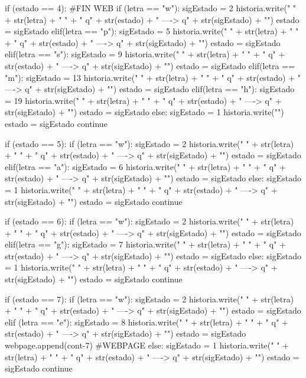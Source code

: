 \documentclass{article}
\begin{document}
\begin{python}
				if (estado == 4): #FIN WEB
					if (letra == "w"):
						sigEstado = 2   
						historia.write(" { " + str(letra) + " } " + "  q" + str(estado) + "  ---->  q" + str(sigEstado) + "\n")
						estado = sigEstado               
					elif(letra == "p"):
						sigEstado = 5
						historia.write(" { " + str(letra) + " } " + "  q" + str(estado) + "  ---->  q" + str(sigEstado) + "\n")
						estado = sigEstado    
					elif(letra == "s"):
						sigEstado = 9
						historia.write(" { " + str(letra) + " } " + "  q" + str(estado) + "  ---->  q" + str(sigEstado) + "\n")
						estado = sigEstado    
					elif(letra == "m"):
						sigEstado = 13
						historia.write(" { " + str(letra) + " } " + "  q" + str(estado) + "  ---->  q" + str(sigEstado) + "\n")
						estado = sigEstado  
					elif(letra == "h"):
						sigEstado = 19
						historia.write(" { " + str(letra) + " } " + "  q" + str(estado) + "  ---->  q" + str(sigEstado) + "\n")
						estado = sigEstado    
					else:
						sigEstado = 1   
						historia.write("\n")
						estado = sigEstado
					continue
			
				if (estado == 5):   
					if (letra == "w"):
						sigEstado = 2   
						historia.write(" { " + str(letra) + " } " + "  q" + str(estado) + "  ---->  q" + str(sigEstado) + "\n")
						estado = sigEstado              
					elif(letra == "a"):
						sigEstado = 6
						historia.write(" { " + str(letra) + " } " + "  q" + str(estado) + "  ---->  q" + str(sigEstado) + "\n")
						estado = sigEstado            
					else:
						sigEstado = 1
						historia.write(" { " + str(letra) + " } " + "  q" + str(estado) + "  ---->  q" + str(sigEstado) + "\n")
						estado = sigEstado
					continue
			
				if (estado == 6):
					if (letra == "w"):
						sigEstado = 2   
						historia.write(" { " + str(letra) + " } " + "  q" + str(estado) + "  ---->  q" + str(sigEstado) + "\n")
						estado = sigEstado              
					elif(letra == "g"):
						sigEstado = 7
						historia.write(" { " + str(letra) + " } " + "  q" + str(estado) + "  ---->  q" + str(sigEstado) + "\n")
						estado = sigEstado            
					else:
						sigEstado = 1
						historia.write(" { " + str(letra) + " } " + "  q" + str(estado) + "  ---->  q" + str(sigEstado) + "\n")
						estado = sigEstado
					continue        
			
				if (estado == 7):            
					if (letra == "w"):
						sigEstado = 2   
						historia.write(" { " + str(letra) + " } " + "  q" + str(estado) + "  ---->  q" + str(sigEstado) + "\n")
						estado = sigEstado 
					elif (letra == "e"):
						sigEstado = 8
						historia.write(" { " + str(letra) + " } " + "  q" + str(estado) + "  ---->  q" + str(sigEstado) + "\n")
						estado = sigEstado
						webpage.append(cont-7) #WEBPAGE           
					else:
						sigEstado = 1
						historia.write(" { " + str(letra) + " } " + "  q" + str(estado) + "  ---->  q" + str(sigEstado) + "\n")
						estado = sigEstado
					continue
			

\end{python}
\end{document}

